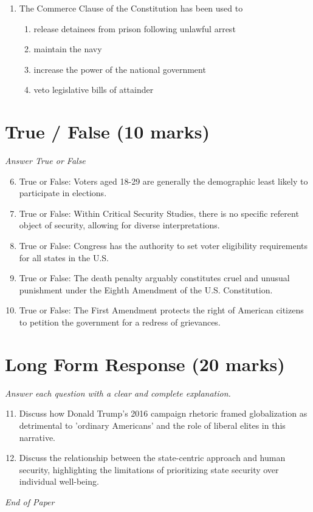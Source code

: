 \documentclass[12pt]{article}
\begin{document}
\begin{enumerate}[label=\arabic*.]
\begin{enumerate}[label=(\alph*)]
    \item Authorizing constitutional amendments
    \item Having representation in Congress
    \item Appealing to the president to adjudicate disputes
\end{enumerate}
\item The Commerce Clause of the Constitution has been used to
\begin{enumerate}[label=(\alph*)]
    \item release detainees from prison following unlawful arrest
    \item maintain the navy
    \item increase the power of the national government
    \item veto legislative bills of attainder
\end{enumerate}
\end{enumerate}

\section*{True / False (10 marks)}
\textit{Answer True or False}
\begin{enumerate}[label=\arabic*.]
\setcounter{enumi}{5}
\item True or False: Voters aged 18-29 are generally the demographic least likely to participate in elections.
\item True or False: Within Critical Security Studies, there is no specific referent object of security, allowing for diverse interpretations.
\item True or False: Congress has the authority to set voter eligibility requirements for all states in the U.S.
\item True or False: The death penalty arguably constitutes cruel and unusual punishment under the Eighth Amendment of the U.S. Constitution.
\item True or False: The First Amendment protects the right of American citizens to petition the government for a redress of grievances.
\end{enumerate}

\section*{Long Form Response (20 marks)}
\textit{Answer each question with a clear and complete explanation.}
\begin{enumerate}[label=\arabic*.]
\setcounter{enumi}{10}
\item Discuss how Donald Trump's 2016 campaign rhetoric framed globalization as detrimental to 'ordinary Americans' and the role of liberal elites in this narrative.
\item Discuss the relationship between the state-centric approach and human security, highlighting the limitations of prioritizing state security over individual well-being.
\end{enumerate}

\vfill
\noindent\textit{End of Paper}
\end{document}
